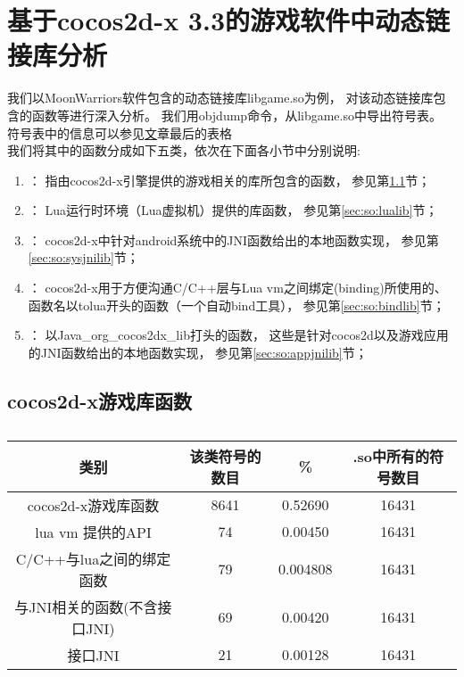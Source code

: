 \section{基于cocos2d-x 3.3的游戏软件中动态链接库分析}
我们以MoonWarriors软件包含的动态链接库libgame.so为例，
对该动态链接库包含的函数等进行深入分析。
我们用objdump命令，从libgame.so中导出符号表。
符号表中的信息可以参见\href{https://ring0.me/2014/12/linkers-loaders-library-notes/}文章最后的表格\\
我们将其中的函数分成如下五类，依次在下面各小节中分别说明:
\begin{enumerate}
\item {}：
	指由cocos2d-x引擎提供的游戏相关的库所包含的函数，
	参见第\ref{sec:so:cocolib}节；
\item {}：
	Lua运行时环境（Lua虚拟机）提供的库函数，
	参见第\ref{sec:so:lualib}节；
\item {}：
	cocos2d-x中针对android系统中的JNI函数给出的本地函数实现，
	参见第\ref{sec:so:sysjnilib}节；
\item {}：
	cocos2d-x用于方便沟通C/C++层与Lua vm之间绑定(binding)所使用的、
	函数名以tolua开头的函数（一个自动bind工具），
	参见第\ref{sec:so:bindlib}节；
\item {}：
	以Java\_org\_cocos2dx\_lib打头的函数，
	这些是针对cocos2d以及游戏应用的JNI函数给出的本地函数实现，
	参见第\ref{sec:so:appjnilib}节；
\end{enumerate}

\subsection{cocos2d-x游戏库函数}
\label{sec:so:cocolib}

\begin{table}[H]
\caption{}
\begin{tabular}{|c|c|c|c|}
\hline 类别 & 该类符号的数目 & \% & .so中所有的符号数目\\
\hline cocos2d-x游戏库函数& 8641 & 0.52690 & 16431  \\
\hline  lua vm 提供的API & 74 & 0.00450 & 16431 \\
\hline C/C++与lua之间的绑定函数 & 79 &  0.004808 & 16431 \\
\hline 与JNI相关的函数(不含接口JNI) & 69 & 0.00420 & 16431 \\
\hline 接口JNI & 21 & 0.00128 & 16431 \\
\end{tabular}
\end{table}

